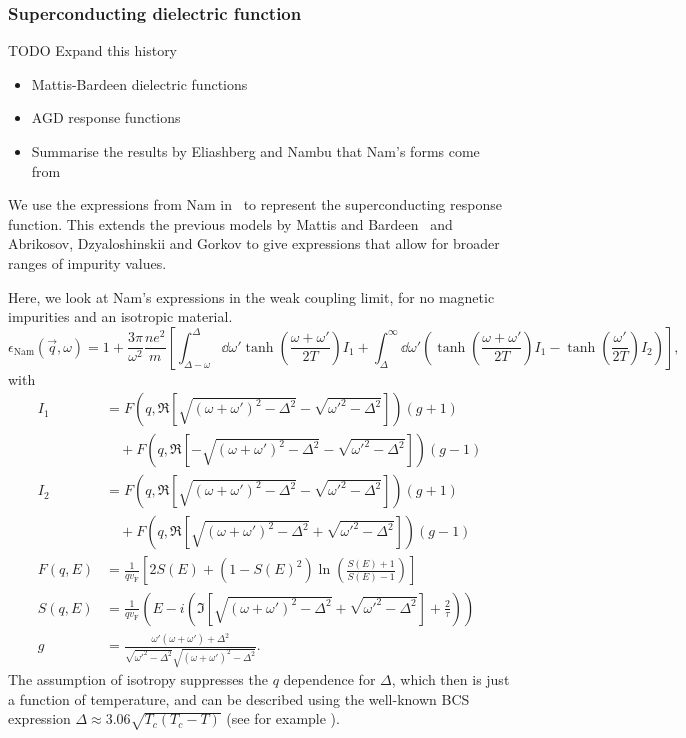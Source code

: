 \documentclass[%
 preprint,
 amsmath,amssymb,
 aps,
]{revtex4-2}
\newcommand{\vf}{v_{\mathrm{F}}}
\begin{document}
\subsubsection{Superconducting dielectric function} \label{subsubsec:namdielectric}

TODO Expand this history
\begin{itemize}
  \item Mattis-Bardeen dielectric functions
  \item AGD response functions
  \item Summarise the results by Eliashberg and Nambu that Nam's forms come from
\end{itemize}

We use the expressions from Nam in~\cite{Nam1967} to represent the superconducting response function.
This extends the previous models by Mattis and Bardeen~\cite{Mattis} and Abrikosov, Dzyaloshinskii and Gorkov\cite{AGD} to give expressions that allow for broader ranges of impurity values.

Here, we look at Nam's expressions in the weak coupling limit, for no magnetic impurities and an isotropic material.
\begin{equation}
	\epsilon_{\mathrm{Nam}}(\vec{q}, \omega) = 1 + \frac{3 \pi}{\omega^2} \frac{n e^2}{m} \left[\int_{\Delta - \omega}^{\Delta}\dd{\omega'} \tanh(\frac{\omega + \omega'}{2 T}) I_1 + \int_{\Delta}^{\infty} \dd{\omega'} \left( \tanh(\frac{\omega + \omega'}{2 T}) I_1  - \tanh(\frac{\omega'}{2 T})I_2 \right) \right], \label{eq:eps}
\end{equation}
with
\begin{align}
	I_1 &= F(q, \Re[\sqrt{(\omega + \omega')^2 - \Delta^2} - \sqrt{\omega'^2 - \Delta^2}]) (g + 1) \nonumber\\
	&\quad + F(q, \Re[-\sqrt{(\omega + \omega')^2 - \Delta^2} - \sqrt{\omega'^2 - \Delta^2}]) (g - 1) \\
	I_2 &= F(q, \Re[\sqrt{(\omega + \omega')^2 - \Delta^2} - \sqrt{\omega'^2 - \Delta^2}]) (g + 1) \nonumber\\
	&\quad + F(q, \Re[\sqrt{(\omega +  \omega')^2 - \Delta^2} + \sqrt{\omega'^2 - \Delta^2}]) (g - 1) \\
	F(q, E) &= \frac{1}{q \vf} \left[2 S(E) + (1 - S(E)^2)\ln(\frac{S(E) + 1}{S(E) - 1})\right] \label{eq:NamF} \\
	S(q, E) &= \frac{1}{q \vf} \left( E - i \left(\Im[\sqrt{(\omega + \omega')^2 - \Delta^2} + \sqrt{\omega'^2 - \Delta^2}] + \frac{2}{\tau} \right) \right) \\
	g &= \frac{\omega' \left(\omega + \omega'\right) + \Delta^2}{\sqrt{\omega'^2 - \Delta^2}\sqrt{(\omega + \omega')^2 - \Delta^2}}.
\end{align}
The assumption of isotropy suppresses the $q$ dependence for $\Delta$, which then is just a function of temperature, and can be described using the well-known BCS expression $\Delta \approx 3.06 \sqrt{T_c(T_c - T)}$ (see for example \cite{Tinkham}).
\end{document}
